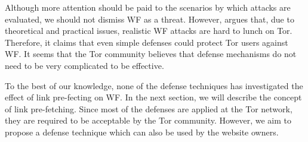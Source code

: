 Although more attention should be paid to the scenarios by which attacks are evaluated, we should not dismiss WF as a threat. However, \cite{TorBlog} argues that, due to theoretical and practical issues, realistic WF attacks are hard to lunch on Tor. Therefore, it claims that even simple defenses could protect Tor users against WF. It seems that the Tor community believes that defense mechanisms do not need to be very complicated to be effective.

To the best of our knowledge, none of the defense techniques has investigated the effect of link pre-fecting on WF. In the next section, we will describe the concept of link pre-fetching. Since most of the defenses are applied at the Tor network, they are required to be acceptable by the Tor community. However, we aim to propose a defense technique which can also be used by the website owners. 

